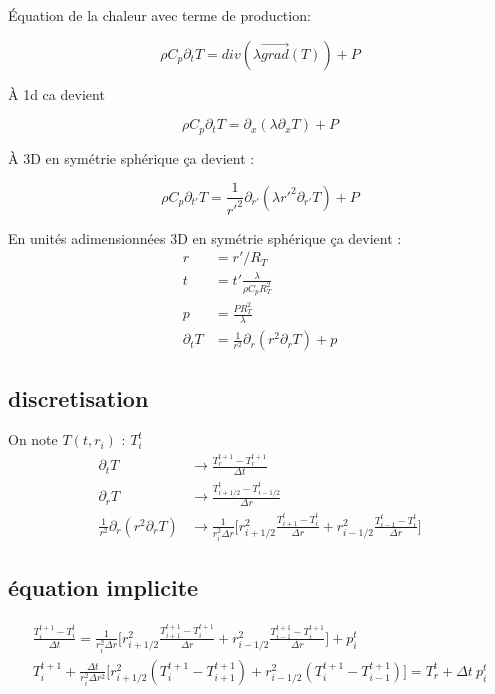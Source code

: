 \documentclass[10pt,a4paper]{article}
\numberwithin{equation}{section}
\begin{document}
Équation de la chaleur avec terme de production:

\begin{equation}
\rho C_p \partial_t T = div ( \lambda \vec{grad}(T))  + P
\end{equation}

À 1d ca devient 

\begin{equation}
\rho C_p \partial_t T = \partial_x ( \lambda \partial_x T)  + P
\end{equation}


 À 3D en symétrie sphérique ça devient :

\begin{equation}
\rho C_p \partial_{t'} T = \frac{1}{r'^2} \partial_{r'} ( \lambda {r'}^2 \partial_{r'} T)  + P
\end{equation}

En unités adimensionnées 3D en symétrie sphérique ça devient :
\begin{align}
r &= r'/R_{T} \\
t &= t' \frac{\lambda}{\rho C_p R_{T}^2} \\
p &= \frac{P R_{T}^2 }{ \lambda}\\
\partial_{t}T &= \frac{1}{r^2} \partial_{r} ({r}^2 \partial_{r} T)  + p
\end{align}




\subsection{discretisation}

On note $T(t,r_i) $ : $  T^t_i$
\begin{align}
\partial_t T &\rightarrow  \frac{T^{t+1}_r - T^{t+1}_r}{\Delta t}\\
\partial_r T &\rightarrow  \frac{T^t_{i+1/2} - T^{t}_{i-1/2}}{\Delta r} \\
\frac{1}{r^2}\partial_r (r^2 \partial_r T ) &\rightarrow \frac{1}{r^2_i \Delta r}\Big [ r^2_{i+1/2}\frac{T^t_{i+1} - T^{t}_{i}}{\Delta r} + r^2_{i-1/2}\frac{T^t_{i-1} - T^{t}_{i}}{\Delta r} \Big]
\end{align}

\subsection{équation implicite}

\begin{multline}
\frac{T^{t+1}_i - T^{t}_i}{\Delta t} = \frac{1}{r^2_i \Delta r}\Big [ r^2_{i+1/2}\frac{T^{t+1}_{i+1} - T^{t+1}_{i}}{\Delta r} + r^2_{i-1/2}\frac{T^{t+1}_{i-1} - T^{t+1}_{i}}{\Delta r} \Big] + p^t_i \\
T^{t+1}_i + \frac{\Delta t}{r^2_i \Delta r^2}\Big [ r^2_{i+1/2}(T^{t+1}_{i} - T^{t+1}_{i+1}) + r^2_{i-1/2}(T^{t+1}_{i}- T^{t+1}_{i-1}) \Big]  =
 T^{t}_r  + \Delta t ~ p^t_i
\end{multline}
\end{document}

